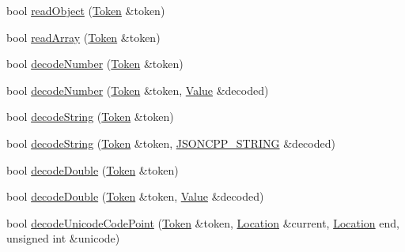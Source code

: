 \begin{DoxyCompactItemize}
\item 
bool \hyperlink{classJson_1_1OurReader_aea198f8101dba55099f4d8121a993530_aea198f8101dba55099f4d8121a993530}{read\+Object} (\hyperlink{classJson_1_1OurReader_1_1Token}{Token} \&token)
\item 
bool \hyperlink{classJson_1_1OurReader_a0b9f58faf4212c6ecb5d8e2a1ac10257_a0b9f58faf4212c6ecb5d8e2a1ac10257}{read\+Array} (\hyperlink{classJson_1_1OurReader_1_1Token}{Token} \&token)
\item 
bool \hyperlink{classJson_1_1OurReader_a272d271290933a89abfd5096dd69c9e9_a272d271290933a89abfd5096dd69c9e9}{decode\+Number} (\hyperlink{classJson_1_1OurReader_1_1Token}{Token} \&token)
\item 
bool \hyperlink{classJson_1_1OurReader_a712270d53a2f023c2f406ac813548340_a712270d53a2f023c2f406ac813548340}{decode\+Number} (\hyperlink{classJson_1_1OurReader_1_1Token}{Token} \&token, \hyperlink{classJson_1_1Value}{Value} \&decoded)
\item 
bool \hyperlink{classJson_1_1OurReader_a34e31d8b8399b7ad493359702b6de6c9_a34e31d8b8399b7ad493359702b6de6c9}{decode\+String} (\hyperlink{classJson_1_1OurReader_1_1Token}{Token} \&token)
\item 
bool \hyperlink{classJson_1_1OurReader_a5046dfa5d43b1770a091aac0a63a9f4b_a5046dfa5d43b1770a091aac0a63a9f4b}{decode\+String} (\hyperlink{classJson_1_1OurReader_1_1Token}{Token} \&token, \hyperlink{json_8h_a1e723f95759de062585bc4a8fd3fa4be_a1e723f95759de062585bc4a8fd3fa4be}{J\+S\+O\+N\+C\+P\+P\+\_\+\+S\+T\+R\+I\+NG} \&decoded)
\item 
bool \hyperlink{classJson_1_1OurReader_a1d1c3b44f6720a0e7c39b5ae8de3981c_a1d1c3b44f6720a0e7c39b5ae8de3981c}{decode\+Double} (\hyperlink{classJson_1_1OurReader_1_1Token}{Token} \&token)
\item 
bool \hyperlink{classJson_1_1OurReader_aa5c15a8cd32754f07430dedba3d1308e_aa5c15a8cd32754f07430dedba3d1308e}{decode\+Double} (\hyperlink{classJson_1_1OurReader_1_1Token}{Token} \&token, \hyperlink{classJson_1_1Value}{Value} \&decoded)
\item 
bool \hyperlink{classJson_1_1OurReader_ac1bf03c161ece082e48da450c50f528d_ac1bf03c161ece082e48da450c50f528d}{decode\+Unicode\+Code\+Point} (\hyperlink{classJson_1_1OurReader_1_1Token}{Token} \&token, \hyperlink{classJson_1_1OurReader_a1bdc7bbc52ba87cae6b19746f2ee0189_a1bdc7bbc52ba87cae6b19746f2ee0189}{Location} \&current, \hyperlink{classJson_1_1OurReader_a1bdc7bbc52ba87cae6b19746f2ee0189_a1bdc7bbc52ba87cae6b19746f2ee0189}{Location} end, unsigned int \&unicode)

\end{DoxyCompactItemize}
